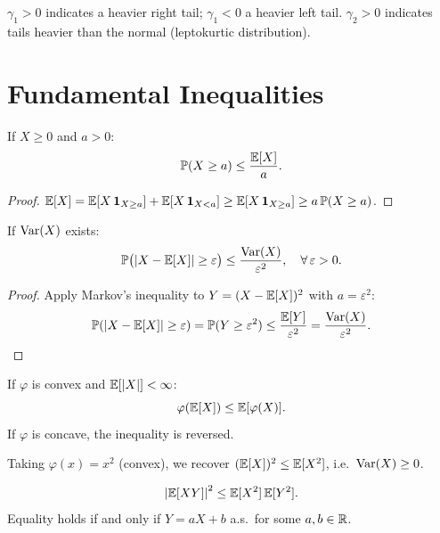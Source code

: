 \begin{remark}
$\gamma_1 > 0$ indicates a heavier right tail; $\gamma_1 < 0$ a heavier left tail.
$\gamma_2 > 0$ indicates tails heavier than the normal (leptokurtic distribution).
\end{remark}

\section{Fundamental Inequalities}

\begin{theorem}
\label{thm:markov_ineq}
If $X \geq 0$ and $a > 0$:
\[
    \mathbb{P}(X \geq a) \leq \frac{\mathbb{E}[X]}{a}.
\]
\end{theorem}

\begin{proof}
$\mathbb{E}[X] = \mathbb{E}[X\,\mathbf{1}_{X \geq a}] + \mathbb{E}[X\,\mathbf{1}_{X < a}]
\geq \mathbb{E}[X\,\mathbf{1}_{X \geq a}] \geq a\,\mathbb{P}(X \geq a)$.
\end{proof}

\begin{theorem}
\label{thm:chebyshev}
If $\mathrm{Var}(X)$ exists:
\[
    \mathbb{P}\bigl(\left| X - \mathbb{E}[X] \right| \geq \varepsilon\bigr)
    \leq \frac{\mathrm{Var}(X)}{\varepsilon^2}, \quad \forall\,\varepsilon > 0.
\]
\end{theorem}

\begin{proof}
Apply Markov's inequality to $Y = (X - \mathbb{E}[X])^2$ with $a = \varepsilon^2$:
\[
    \mathbb{P}(\left| X - \mathbb{E}[X] \right| \geq \varepsilon) = \mathbb{P}(Y \geq \varepsilon^2)
    \leq \frac{\mathbb{E}[Y]}{\varepsilon^2} = \frac{\mathrm{Var}(X)}{\varepsilon^2}. \qedhere
\]
\end{proof}

\begin{theorem}
\label{thm:jensen}
If $\varphi$ is convex and $\mathbb{E}[\left| X \right|] < \infty$:
\[
    \varphi(\mathbb{E}[X]) \leq \mathbb{E}[\varphi(X)].
\]
If $\varphi$ is concave, the inequality is reversed.
\end{theorem}

\begin{example}
Taking $\varphi(x) = x^2$ (convex), we recover $(\mathbb{E}[X])^2 \leq \mathbb{E}[X^2]$,
i.e.\ $\mathrm{Var}(X) \geq 0$.
\end{example}

\begin{theorem}
\label{thm:cauchy_schwarz}
\[
    \left| \mathbb{E}[XY] \right|^2 \leq \mathbb{E}[X^2]\,\mathbb{E}[Y^2].
\]
Equality holds if and only if $Y = aX + b$ a.s.\ for some $a, b \in \mathbb{R}$.
\end{theorem}

